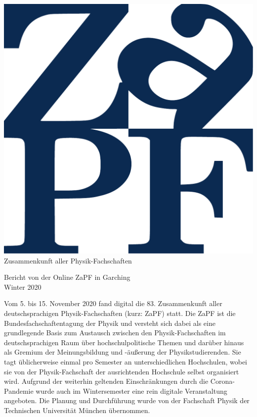 \documentclass{scrartcl}
\begin{document}
\hspace{0.74\textwidth}
\begin{minipage}{0.25\textwidth}
      \vspace{-1cm}
      \centering
      \includegraphics[width=.89\textwidth]{../logo.pdf}
      \small Zusammenkunft aller Physik-Fachschaften
\end{minipage}

\begin{center}
      \vspace{1.5cm}
      \huge{Bericht von der Online ZaPF in Garching \\ Winter 2020}
      \vspace{1cm}
\end{center}

Vom 5. bis 15. November 2020 fand digital die 83. Zusammenkunft aller deutschsprachigen Physik-Fachschaften (kurz: ZaPF) statt. Die ZaPF ist die Bundesfachschaftentagung der Physik und versteht sich dabei als eine grundlegende Basis zum Austausch zwischen den Physik-Fachschaften im deutschsprachigen Raum über hochschulpolitische Themen und darüber hinaus als Gremium der Meinungsbildung und -äußerung der Physikstudierenden. Sie tagt üblicherweise einmal pro Semester an unterschiedlichen Hochschulen, wobei sie von der Physik-Fachschaft der ausrichtenden Hochschule selbst organisiert wird. Aufgrund der weiterhin geltenden Einschränkungen durch die Corona-Pandemie wurde auch im Wintersemester eine rein digitale Veranstaltung angeboten. Die Planung und Durchführung wurde von der Fachschaft Physik der Technischen Universität München übernommen.
\end{document}
